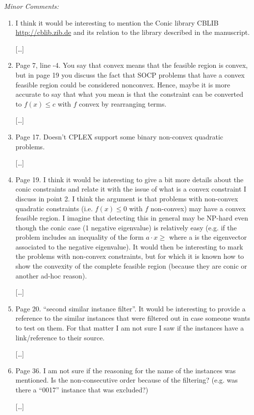 \documentclass[11pt]{article}
\newcommand{\rep}[1]{{\textcolor{acblue}{#1}}}
\begin{document}
{\it
Minor Comments:
\begin{enumerate}

\item I think it would be interesting to mention the Conic library CBLIB \url{http://cblib.zib.de} and its relation to the library described in the manuscript.

\rep{[\dots] }


\item Page 7, line -4. You say that convex means that the feasible region is
convex, but in page 19 you discuss the fact that SOCP problems that have
a convex feasible region could be considered nonconvex. Hence, maybe it
is more accurate to say that what you mean is that the constraint can be
converted to $f (x) \le c$ with $f$ convex by rearranging terms.

\rep{[\dots] }

\item Page 17. Doesn't CPLEX support some binary non-convex quadratic
problems.

\rep{[\dots] }

\item Page 19. I think it would be interesting to give a bit more details about the conic constraints and relate it with the issue of what is a convex
constraint I discuss in point 2. I think the argument is that problems with
non-convex quadratic constraints (i.e. $f (x) \le 0$ with $f$ non-convex) may
have a convex feasible region. I imagine that detecting this in general may
be NP-hard even though the conic case (1 negative eigenvalue) is relatively
easy (e.g. if the problem includes an inequality of the form $a \cdot x \ge$ where
a is the eigenvector associated to the negative eigenvalue). It would then
be interesting to mark the problems with non-convex constraints, but for
which it is known how to show the convexity of the complete feasible
region (because they are conic or another ad-hoc reason).

\rep{[\dots] }


\item Page 20. ``second similar instance filter''. It would be interesting to provide a reference to the similar instances that were filtered out in case
someone wants to test on them. For that matter I am not sure I saw if
the instances have a link/reference to their source.

\rep{[\dots] }


\item Page 36. I am not sure if the reasoning for the name of the instances was mentioned. Is the non-consecutive order because of the filtering? (e.g.
was there a ``0017'' instance that was excluded?)

\rep{[\dots] }



\end{enumerate}
}
\end{document}
